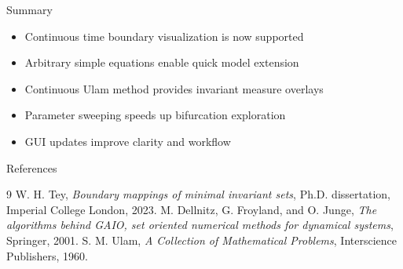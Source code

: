 \documentclass[aspectratio=169]{beamer}
\begin{document}
\begin{frame}{Summary}
  \begin{itemize}
    \item Continuous time boundary visualization is now supported
    \item Arbitrary simple equations enable quick model extension
    \item Continuous Ulam method provides invariant measure overlays
    \item Parameter sweeping speeds up bifurcation exploration
    \item GUI updates improve clarity and workflow
  \end{itemize}
\end{frame}

\begin{frame}{References}
  \begin{thebibliography}{9}
     W. H. Tey, \textit{Boundary mappings of minimal invariant sets}, Ph.D. dissertation, Imperial College London, 2023.
     M. Dellnitz, G. Froyland, and O. Junge, \textit{The algorithms behind GAIO, set oriented numerical methods for dynamical systems}, Springer, 2001.
     S. M. Ulam, \textit{A Collection of Mathematical Problems}, Interscience Publishers, 1960.
  \end{thebibliography}
\end{frame}
\end{document}
